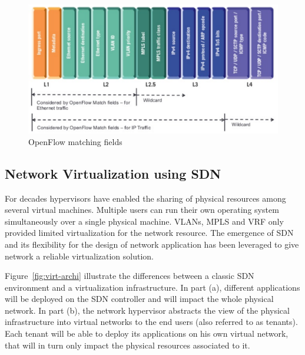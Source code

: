 \begin{figure}[h]
    \centering
    \includegraphics[scale=0.7]{figures/openflow-matchfields.pdf}
    \caption{OpenFlow matching fields~\cite{openflow-matchfields}}
    \label{fig:matching-fields}
\end{figure}

\subsection{Network Virtualization using SDN}
\label{def:netvirt}

For decades hypervisors have enabled the sharing of physical resources among several virtual machines.
Multiple users can run their own operating system simultaneously over a single physical machine.
VLANs, MPLS and VRF only provided limited virtualization for the network resource. The emergence of SDN and its flexibility for the design of network application has been leveraged to give network a reliable virtualization solution.

Figure~\ref{fig:virt-archi} illustrate the differences between a classic SDN environment and a virtualization infrastructure. In part (a), different applications will be deployed on the SDN controller and will impact the whole physical network.
In part (b), the network hypervisor abstracts the view of the physical infrastructure into virtual networks to the end users (also referred to as tenants).
Each tenant will be able to deploy its applications on his own virtual network, that will in turn only impact the physical resources associated to it.

